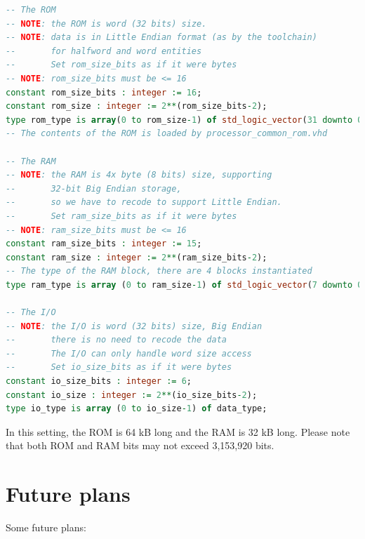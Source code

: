 \documentclass[12pt]{article}
\begin{document}
\begin{lstlisting}[language=VHDL]
-- The ROM
-- NOTE: the ROM is word (32 bits) size.
-- NOTE: data is in Little Endian format (as by the toolchain)
--       for halfword and word entities
--       Set rom_size_bits as if it were bytes
-- NOTE: rom_size_bits must be <= 16
constant rom_size_bits : integer := 16;
constant rom_size : integer := 2**(rom_size_bits-2);
type rom_type is array(0 to rom_size-1) of std_logic_vector(31 downto 0);
-- The contents of the ROM is loaded by processor_common_rom.vhd

-- The RAM
-- NOTE: the RAM is 4x byte (8 bits) size, supporting
--       32-bit Big Endian storage,
--       so we have to recode to support Little Endian.
--       Set ram_size_bits as if it were bytes
-- NOTE: ram_size_bits must be <= 16
constant ram_size_bits : integer := 15;
constant ram_size : integer := 2**(ram_size_bits-2);
-- The type of the RAM block, there are 4 blocks instantiated
type ram_type is array (0 to ram_size-1) of std_logic_vector(7 downto 0);
                    
-- The I/O
-- NOTE: the I/O is word (32 bits) size, Big Endian
--       there is no need to recode the data
--       The I/O can only handle word size access
--       Set io_size_bits as if it were bytes
constant io_size_bits : integer := 6;
constant io_size : integer := 2**(io_size_bits-2);
type io_type is array (0 to io_size-1) of data_type;
\end{lstlisting}

In this setting, the ROM is 64 kB long and the RAM is 32 kB long. Please note that both ROM and RAM bits may not exceed 3,153,920 bits.

%
%
%

\section{Future plans}
Some future plans:
\end{document}
